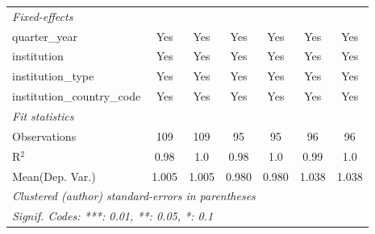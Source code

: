 \begin{tabular}{lcccccc}
   \emph{Fixed-effects}\\
   quarter\_year                      & Yes            & Yes           & Yes           & Yes            & Yes          & Yes\\  
   institution                        & Yes            & Yes           & Yes           & Yes            & Yes          & Yes\\  
   institution\_type                  & Yes            & Yes           & Yes           & Yes            & Yes          & Yes\\  
   institution\_country\_code         & Yes            & Yes           & Yes           & Yes            & Yes          & Yes\\  
   \midrule
   \emph{Fit statistics}\\
   Observations                       & 109            & 109           & 95            & 95             & 96           & 96\\  
   R$^2$                              & 0.98           & 1.0           & 0.98          & 1.0            & 0.99         & 1.0\\  
Mean(Dep. Var.) & 1.005 & 1.005 & 0.980 & 0.980 & 1.038 & 1.038 \\
   \midrule \midrule
   \multicolumn{7}{l}{\emph{Clustered (author) standard-errors in parentheses}}\\
   \multicolumn{7}{l}{\emph{Signif. Codes: ***: 0.01, **: 0.05, *: 0.1}}\\
\end{tabular}
\par\endgroup
